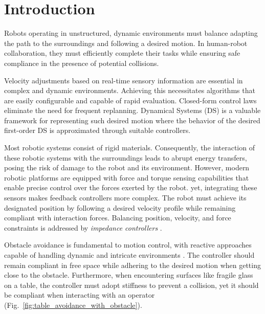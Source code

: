\section{Introduction}
Robots operating in unstructured, dynamic environments must balance adapting the path to the surroundings and following a desired motion. In human-robot collaboration, they must efficiently complete their tasks while ensuring safe compliance in the presence of potential collisions.

Velocity adjustments based on real-time sensory information are essential in complex and dynamic environments. Achieving this necessitates algorithms that are easily configurable and capable of rapid evaluation. Closed-form control laws eliminate the need for frequent replanning. Dynamical Systems (DS) is a valuable framework for representing such desired motion \cite{huber2019avoidance} where the behavior of the desired first-order DS is approximated through suitable controllers. 

Most robotic systems consist of rigid materials. Consequently, the interaction of these robotic systems with the surroundings leads to abrupt energy transfers, posing the risk of damage to the robot and its environment. However, modern robotic platforms are equipped with force and torque sensing capabilities that enable precise control over the forces exerted by the robot.
yet, integrating these sensors makes feedback controllers more complex. The robot must achieve its designated position by following a desired velocity profile while remaining compliant with interaction forces. Balancing position, velocity, and force constraints is addressed by \textit{impedance controllers} \iflong
\parencite{takegaki1981new, hogan1984impedance} \else \parencite{hogan1985impedance}\fi.

Obstacle avoidance is fundamental to motion control, with reactive approaches capable of handling dynamic and intricate environments \parencite{huber2019avoidance}. The controller should remain compliant in free space while adhering to the desired motion when getting close to the obstacle. Furthermore, when encountering surfaces like fragile glass on a table, the controller must adopt stiffness to prevent a collision, yet it should be compliant when interacting with an operator (Fig.~\ref{fig:table_avoidance_with_obstacle}).

